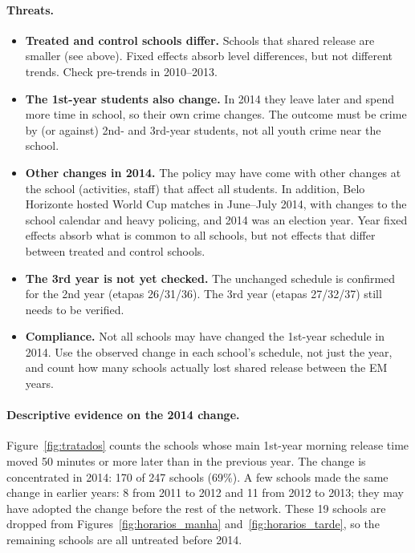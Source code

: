 \paragraph{Threats.}
\begin{itemize}
  \item \textbf{Treated and control schools differ.} Schools that shared
        release are smaller (see above). Fixed effects absorb level
        differences, but not different trends. Check pre-trends in 2010--2013.
  \item \textbf{The 1st-year students also change.} In 2014 they leave later
        and spend more time in school, so their own crime changes. The outcome
        must be crime by (or against) 2nd- and 3rd-year students, not all
        youth crime near the school.
  \item \textbf{Other changes in 2014.} The policy may have come with other
        changes at the school (activities, staff) that affect all students. In
        addition, Belo Horizonte hosted World Cup matches in June--July 2014,
        with changes to the school calendar and heavy policing, and 2014 was an
        election year. Year fixed effects absorb what is common to all
        schools, but not effects that differ between treated and control
        schools.
  \item \textbf{The 3rd year is not yet checked.} The unchanged schedule is
        confirmed for the 2nd year (etapas 26/31/36). The 3rd year (etapas
        27/32/37) still needs to be verified.
  \item \textbf{Compliance.} Not all schools may have changed the 1st-year
        schedule in 2014. Use the observed change in each school's schedule,
        not just the year, and count how many schools actually lost shared
        release between the EM years.
\end{itemize}

\paragraph{Descriptive evidence on the 2014 change.} Figure~\ref{fig:tratados}
counts the schools whose main 1st-year morning release time moved 50 minutes or
more later than in the previous year. The change is concentrated in 2014: 170
of 247 schools (69\%). A few schools made the same change in earlier years: 8 from 2011 to 2012 and
11 from 2012 to 2013;
they may have adopted the change before the rest of the network. These 19
schools are dropped from Figures~\ref{fig:horarios_manha}
and~\ref{fig:horarios_tarde}, so the remaining schools are all untreated before
2014.

